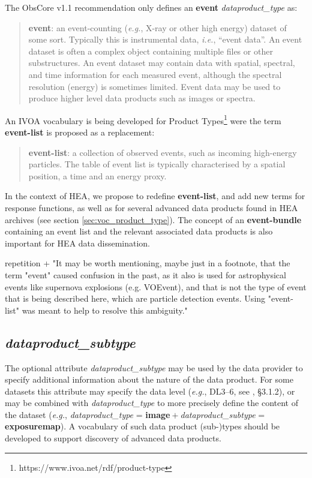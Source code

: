 \documentclass[11pt,a4paper]{ivoa}
\begin{document}
The ObsCore v1.1 recommendation \citep{2017ivoa.spec.0509L} only defines an {\bf event} {\em dataproduct\_type} as:

\begin{quote}
{\bf event}: an event-counting ({\em e.g.\/}, X-ray or other high energy) dataset of some sort. Typically this is instrumental data, {\em i.e.\/}, ``event data''.  An event dataset is often a complex object containing multiple files or other substructures. An event dataset may contain data with spatial, spectral, and time information for each measured event, although the spectral resolution (energy) is sometimes limited. Event data may be used to produce higher level data products such as images or spectra.
\end{quote}

An \gls{IVOA} vocabulary is being developed for Product Types\footnote{https://www.ivoa.net/rdf/product-type} were the term \textbf{event-list} is proposed as a replacement:

\begin{quote}
{\bf event-list}: a collection of observed events, such as incoming high-energy particles. The table of event list is typically characterised by a spatial position, a time and an energy proxy.
\end{quote}

In the context of \gls{HEA}, we propose to redefine \textbf{event-list}, and add new terms for response functions, as well as for several advanced data products found in \gls{HEA} archives (see section \ref{sec:voc_product_type}). The concept of an \textbf{event-bundle} containing an event list and the relevant associated data products is also important for \gls{HEA} data dissemination.

repetition + "It may be worth mentioning, maybe just in a footnote, that the term "event" caused confusion in the past, as it also is used for astrophysical events like supernova explosions (e.g. VOEvent), and that is not the type of event that is being described here, which are particle detection events. Using "event-list" was meant to help to resolve this ambiguity."

\subsection{{\em dataproduct\_subtype}}

The optional attribute {\em dataproduct\_subtype} may be used by the data provider to specify additional information about the nature of the data product. For some datasets this attribute may specify the data level ({\em e.g.\/}, DL3--6, see \citealt{2024ivoa.note.heig}, \S3.1.2), or may be combined with {\em dataproduct\_type\/} to more precisely define the content of the dataset ({\em e.g.\/}, {\em dataproduct\_type\/} = {\bf image}${}+{}${\em dataproduct\_subtype\/} = {\bf exposuremap}).  A vocabulary of such data product (sub-)types should be developed to support discovery of advanced data products.
\end{document}
